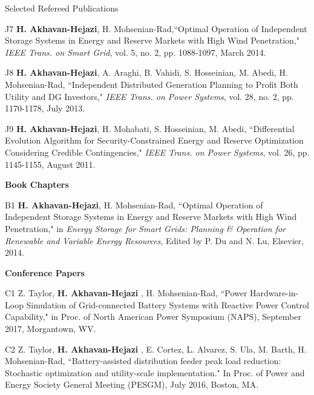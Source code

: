 \documentclass{resume} %
\begin{document}
\begin{rSection}{ Selected Refereed Publications}
\item [J7] {\bf	H. Akhavan-Hejazi}, H. Mohsenian-Rad,``Optimal Operation of Independent Storage Systems in Energy and Reserve Markets with High Wind Penetration," \emph{IEEE Trans. on Smart Grid}, vol. 5, no. 2, pp. 1088-1097, March 2014.

\item [J8] {\bf	H. Akhavan-Hejazi}, A. Araghi, B. Vahidi, S. Hosseinian, M. Abedi,  H. Mohsenian-Rad, ``Independent Distributed Generation Planning to Profit Both Utility and DG Investors," \emph{IEEE Trans. on Power Systems}, vol. 28, no. 2, pp. 1170-1178, July 2013.

\item [J9]{\bf	H. Akhavan-Hejazi}, H. Mohabati, S. Hosseinian, M. Abedi, ``Differential Evolution Algorithm for Security-Constrained Energy and Reserve Optimization Considering Credible Contingencies," \emph{IEEE Trans. on Power Systems}, vol. 26, pp. 1145-1155, August 2011.



 




\vspace{+.15275in}

{\bf Book Chapters}

\vspace{+.001275in}

\item [B1]  {\bf H. Akhavan-Hejazi}, H. Mohsenian-Rad,  ``Optimal  Operation of Independent Storage Systems in Energy and Reserve Markets with High Wind Penetration," in \emph{Energy Storage for Smart Grids: Planning \& Operation for Renewable and Variable Energy Resources}, Edited by P. Du and N. Lu, Elsevier, 2014.


\vspace{+.152275in}

{\bf   Conference Papers}

\item [C1] Z. Taylor, {\bf H. Akhavan-Hejazi} ,  H. Mohsenian-Rad, ``Power Hardware-in-Loop Simulation of Grid-connected
Battery Systems with Reactive Power Control Capability,"  in Proc. of  North American Power Symposium (NAPS), September 2017, Morgantown, WV.


\item [C2] Z. Taylor, {\bf H. Akhavan-Hejazi} ,  E. Cortez, L. Alvarez, S.  Ula, M.  Barth, H. Mohsenian-Rad, ``Battery-assisted distribution feeder peak load reduction: Stochastic optimization and utility-scale implementation." In Proc. of Power and Energy Society General Meeting (PESGM), July 2016, Boston, MA.




\end{rSection}
\end{document}
